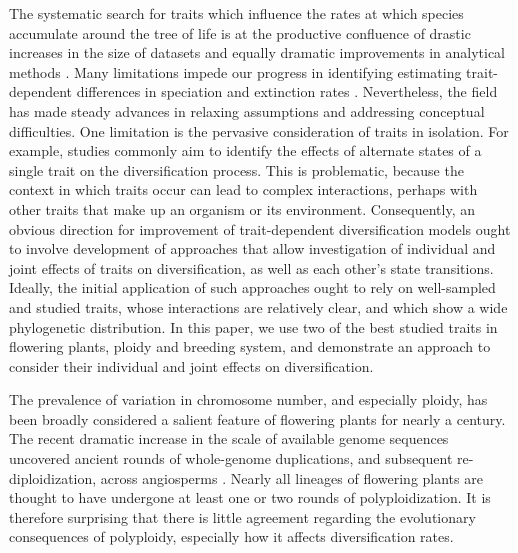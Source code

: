 The systematic search for traits which influence the rates at which species accumulate around the tree of life is at the productive confluence of drastic increases in the size of datasets and equally dramatic improvements in analytical methods \citep{maddison_2007,fitzjohn_2009,goldberg_2012,beaulieu_2016}. %
Many limitations impede our progress in identifying estimating trait-dependent differences in speciation and extinction rates \citep{maddison_2014, rabosky_2015}. %
Nevertheless, the field has made steady advances in relaxing assumptions and addressing conceptual difficulties. %
One limitation is the pervasive consideration of traits in isolation. 
For example, studies commonly aim to identify the effects of alternate states of a single trait on the diversification process. 
This is problematic, because the context in which traits occur can lead to complex interactions, perhaps with other traits that make up an organism or its environment.
Consequently, an obvious direction for improvement of trait-dependent diversification models ought to involve development of approaches that allow investigation of individual and joint effects of traits on diversification, as well as each other's state transitions.
Ideally, the initial application of such approaches ought to rely on well-sampled and studied traits, whose interactions are relatively clear, and which show a wide phylogenetic distribution. 
In this paper, we use two of the best studied traits in flowering plants, ploidy and breeding system, and demonstrate an approach to consider their individual and joint effects on diversification.

The prevalence of variation in chromosome number, and especially ploidy, has been broadly considered a salient feature of flowering plants for nearly a century. %
The recent dramatic increase in the scale of available genome sequences uncovered ancient rounds of whole-genome duplications, and subsequent re-diploidization, across angiosperms \citep{lynch2000,vision2000}. 
Nearly all lineages of flowering plants are thought to have undergone at least one or two rounds of polyploidization. %
It is therefore surprising that there is little agreement regarding the evolutionary consequences of polyploidy, especially how it affects diversification rates. %


